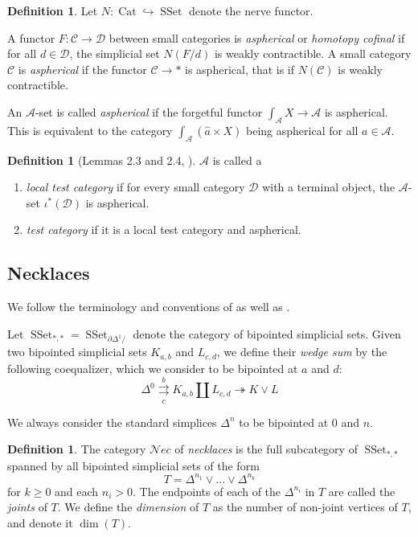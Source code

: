 \documentclass[12pt,a4paper,reqno]{amsart}
\DeclareMathOperator{\SSet}{SSet}
\DeclareMathOperator{\Cat}{Cat}
\newcommand{\nec}{\mathcal{N}ec} %
\theoremstyle{definition}
\newtheorem{Def}[Thm]{Definition}
\theoremstyle{remark}
\begin{document}
\begin{Def}
Let $N: \Cat\hookrightarrow \SSet$ denote the nerve functor.

A functor $F: \mathcal{C}\rightarrow \mathcal{D}$ between small categories is \emph{aspherical} or \emph{homotopy cofinal} if for all $d\in \mathcal{D}$, the simplicial set $N(F/d)$ is weakly contractible.  A small category $\mathcal{C}$ is \emph{aspherical} if the functor $\mathcal{C}\rightarrow *$ is aspherical, that is if $N(\mathcal{C})$ is weakly contractible.

An $\mathcal{A}$-set is called \emph{aspherical} if the forgetful functor $\int_{\mathcal{A}}X\to \mathcal{A}$ is aspherical. This is equivalent to the category $\int_{\mathcal{A}}(\hat{a}\times X)$ being aspherical for all $a\in \mathcal{A}$.
\end{Def}

\begin{Def}[Lemmas 2.3 and 2.4, \cite{jardine2006categorical}]
$\mathcal{A}$ is called a
\begin{enumerate}[1.]
\item \emph{local test category} if for every small category $\mathcal{D}$ with a terminal object, the $\mathcal{A}$-set $\iota^{*}(\mathcal{D})$ is aspherical.
\item \emph{test category} if it is a local test category and aspherical.
\end{enumerate}
\end{Def}

\subsection{Necklaces}

We follow the terminology and conventions of \cite[\S 3]{dugger2011rigidification} as well as \cite[\S 3.2]{mertens2026nerves}.

Let $\SSet_{*,*} = \SSet_{\partial\Delta^{1}/}$ denote the category of bipointed simplicial sets. Given two bipointed simplicial sets $K_{a,b}$ and $L_{c,d}$, we define their \emph{wedge sum} by the following coequalizer, which we consider to be bipointed at $a$ and $d$:
$$
\Delta^{0}\overset{b}{\underset{c}{\rightrightarrows}} K_{a,b}\amalg L_{c,d}\twoheadrightarrow K\vee L
$$


We always consider the standard simplices $\Delta^{n}$ to be bipointed at $0$ and $n$.

\begin{Def}
The category $\nec$ of \emph{necklaces} is the full subcategory of $\SSet_{*,*}$ spanned by all bipointed simplicial sets of the form
$$
T = \Delta^{n_{1}}\vee \dots\vee \Delta^{n_{k}}
$$
for $k\geq 0$ and each $n_{i} > 0$. The endpoints of each of the $\Delta^{n_{i}}$ in $T$ are called the \emph{joints} of $T$. We define the \emph{dimension} of $T$ as the number of non-joint vertices of $T$, and denote it $\dim(T)$.
\end{Def}
\end{document}
